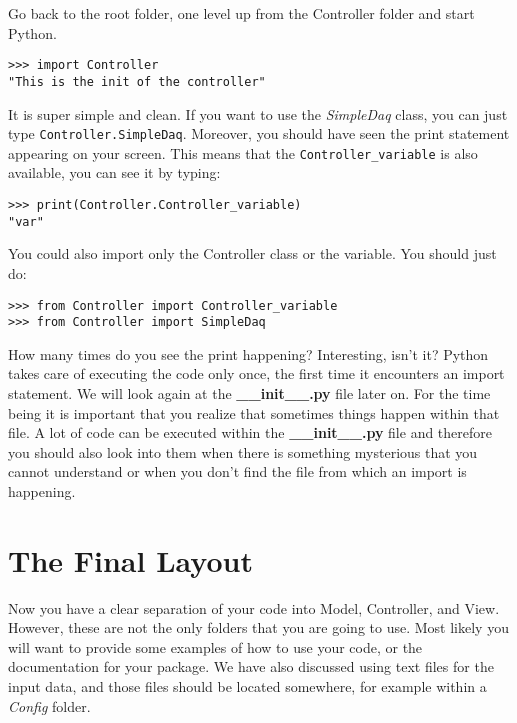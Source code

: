 Go back to the root folder, one level up from the Controller folder and
start Python.

\begin{verbatim}
>>> import Controller
"This is the init of the controller"
\end{verbatim}

It is super simple and clean. If you want to use the \emph{SimpleDaq}
class, you can just type \texttt{Controller.SimpleDaq}. Moreover, you
should have seen the print statement appearing on your screen. This
means that the \texttt{Controller_variable} is also available, you can
see it by typing:

\begin{verbatim}
>>> print(Controller.Controller_variable)
"var"
\end{verbatim}

You could also import only the Controller class or the variable. You
should just do:

\begin{verbatim}
>>> from Controller import Controller_variable
>>> from Controller import SimpleDaq
\end{verbatim}

How many times do you see the print happening? Interesting, isn't it?
Python takes care of executing the code only once, the first time it
encounters an import statement. We will look again at the
\textbf{\_\_init\_\_.py} file later on. For the time being it is
important that you realize that sometimes things happen within that
file. A lot of code can be executed within the \textbf{\_\_init\_\_.py}
file and therefore you should also look into them when there is
something mysterious that you cannot understand or when you don't find
the file from which an import is happening.


\section{The Final Layout}\label{the-finallayout}
Now you have a clear separation of your code into Model, Controller, and
View. However, these are not the only folders that you are going to use.
Most likely you will want to provide some examples of how to use your
code, or the documentation for your package. We have also discussed
using text files for the input data, and those files should be located
somewhere, for example within a \emph{Config} folder.

